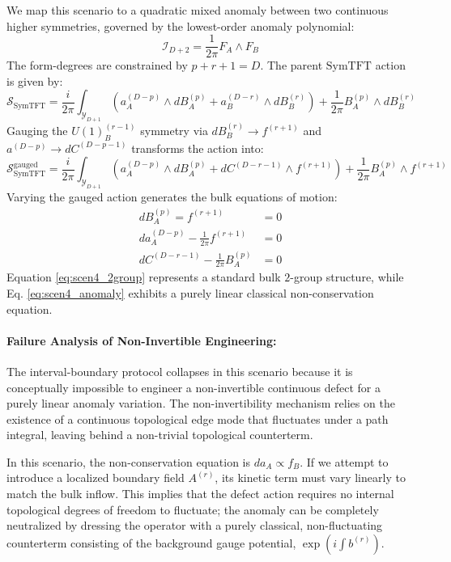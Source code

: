 \documentclass[aps,preprint,nofootinbib,preprintnumbers,eqsecnum,superscriptaddress]{revtex4}
\numberwithin{equation}{section}
\begin{document}
We map this scenario to a quadratic mixed anomaly between two continuous higher symmetries, governed by the lowest-order anomaly polynomial:
\begin{equation}
    \mathcal{I}_{D+2} = \frac{1}{2\pi} F_A \wedge F_B
\end{equation}
The form-degrees are constrained by $p + r + 1 = D$. The parent $\text{SymTFT}$ action is given by:
\begin{equation}
    \mathcal{S}_{\text{SymTFT}} = \frac{i}{2\pi} \int_{\mathcal{Y}_{D+1}} \left( a^{(D-p)}_A \wedge d B^{(p)}_A + a^{(D-r)}_B \wedge d B^{(r)}_B \right) + \frac{1}{2\pi} B^{(p)}_A \wedge d B^{(r)}_B
\end{equation}
Gauging the $U(1)^{(r-1)}_B$ symmetry via $dB^{(r)}_B \to f^{(r+1)}$ and $a^{(D-p)} \to dC^{(D-p-1)}$ transforms the action into:
\begin{equation}
    \mathcal{S}^\text{gauged}_{\text{SymTFT}} = \frac{i}{2\pi} \int_{\mathcal{Y}_{D+1}} \left( a^{(D-p)}_A \wedge d B^{(p)}_A + dC^{(D-r-1)} \wedge f^{(r+1)} \right) + \frac{1}{2\pi} B^{(p)}_A \wedge f^{(r+1)}
\end{equation}
Varying the gauged action generates the bulk equations of motion:
\begin{align}
    dB^{(p)}_A = f^{(r+1)} &= 0 \\
    da^{(D-p)}_A - \frac{1}{2\pi} f^{(r+1)} &= 0 \label{eq:scen4_anomaly} \\
    dC^{(D-r-1)} - \frac{1}{2\pi} B^{(p)}_A &= 0 \label{eq:scen4_2group}
\end{align}
Equation \eqref{eq:scen4_2group} represents a standard bulk $2$-group structure, while Eq. \eqref{eq:scen4_anomaly} exhibits a purely linear classical non-conservation equation.

\paragraph{Failure Analysis of Non-Invertible Engineering:}
The interval-boundary protocol collapses in this scenario because it is conceptually impossible to engineer a non-invertible continuous defect for a purely linear anomaly variation. The non-invertibility mechanism relies on the existence of a continuous topological edge mode that fluctuates under a path integral, leaving behind a non-trivial topological counterterm. 

In this scenario, the non-conservation equation is $da_A \propto f_B$. If we attempt to introduce a localized boundary field $A^{(r)}$, its kinetic term must vary linearly to match the bulk inflow. This implies that the defect action requires no internal topological degrees of freedom to fluctuate; the anomaly can be completely neutralized by dressing the operator with a purely classical, non-fluctuating counterterm consisting of the background gauge potential, $\exp\left(i \int b^{(r)}\right)$.
\end{document}
